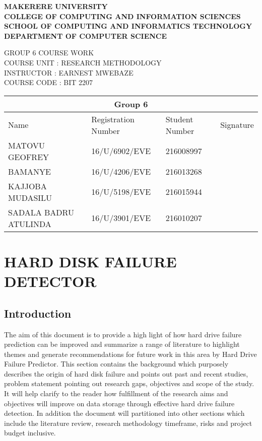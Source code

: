 \documentclass{article}
\begin{document}
	\begin{center}
		{\huge\textbf{MAKERERE UNIVERSITY}}\\
		{\large\textbf{COLLEGE OF COMPUTING AND INFORMATION SCIENCES}}\\
		\textbf{SCHOOL OF COMPUTING AND INFORMATICS TECHNOLOGY}\\
		\textbf{DEPARTMENT OF COMPUTER SCIENCE}
	\end{center}
	GROUP 6 COURSE WORK\\
	COURSE UNIT : RESEARCH METHODOLOGY\\
	INSTRUCTOR : EARNEST MWEBAZE\\
	COURSE CODE : BIT 2207\\



\begin{tabular}{|p{5cm} |p{3cm}|p{3cm}|p{3cm}|}
\hline
\multicolumn{4}{|c|}{Group 6}\\
\hline
\hline
Name & Registration Number & Student Number&Signature\\
\hline
MATOVU GEOFREY&16/U/6902/EVE&216008997&\\
BAMANYE&16/U/4206/EVE&216013268&\\
KAJJOBA MUDASILU&16/U/5198/EVE&216015944&\\
SADALA BADRU ATULINDA&16/U/3901/EVE&216010207\\
\hline

\end{tabular}
\section{HARD DISK FAILURE DETECTOR}
\subsection{Introduction}
The aim of this document is to provide a high light of how hard drive failure prediction can be improved and summarize a range of literature to highlight themes and generate recommendations for future work in this area by Hard Drive Failure Predictor. This section contains the background which purposely describes the origin of hard disk failure and points out past and recent studies, problem statement pointing out research gaps, objectives and scope of the study. It will help clarify to the reader how fulfillment of the research aims and objectives will improve on data storage through effective hard drive failure detection. In addition the document will partitioned into other sections which include the literature review, research methodology timeframe, risks and project budget inclusive.  
\end{document}
